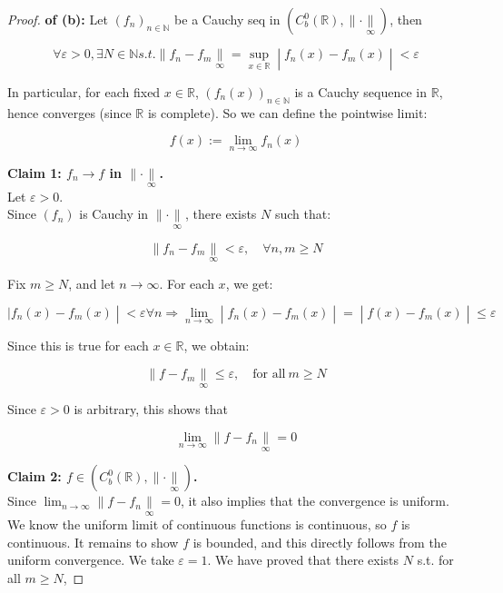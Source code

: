 \begin{proof}

\textbf{of (b):} Let \((f_{n})_{n \in \mathbb{N}}\) be a Cauchy seq in \((C_{b}^{0}(\mathbb{R}), \parallel \cdot \underset{\infty}{\parallel})\), then

\[\left. \forall\varepsilon > 0,\exists N \in \mathbb{N} s.t. \parallel f_{n} - f_{m}\underset{\infty}{\parallel} = \sup\limits_{x \in \mathbb{R}} \middle| f_{n}(x) - f_{m}(x) \middle| < \varepsilon \right.\]

In particular, for each fixed \(x \in \mathbb{R}\), \((f_{n}(x))_{n \in \mathbb{N}}\) is a Cauchy sequence in \(\mathbb{R}\), hence converges (since \(\mathbb{R}\) is complete). So we can define the pointwise limit:

\[f(x) := \lim\limits_{n\rightarrow\infty}f_{n}(x)\]

\textbf{Claim 1: \(f_{n}\rightarrow f\) in \(\parallel \cdot \underset{\infty}{\parallel}\).}\\
Let \(\varepsilon > 0\).\\
Since \((f_{n})\) is Cauchy in \(\parallel \cdot \underset{\infty}{\parallel}\), there exists \(N\) such that:

\[\parallel f_{n} - f_{m}\underset{\infty}{\parallel} < \varepsilon,\quad\forall n,m \geq N\]

Fix \(m \geq N\), and let \(n\rightarrow\infty\). For each \(x\), we get:

\[\left. |f_{n}(x) - f_{m}(x) \middle| < \varepsilon\forall n\Longrightarrow\lim\limits_{n\rightarrow\infty} \middle| f_{n}(x) - f_{m}(x) \middle| = \middle| f(x) - f_{m}(x) \middle| \leq \varepsilon \right.\]

Since this is true for each \(x \in \mathbb{R}\), we obtain:

\[\parallel f - f_{m}\underset{\infty}{\parallel} \leq \varepsilon,\quad\text{for all}\ m \geq N\]

Since \(\varepsilon > 0\) is arbitrary, this shows that

\[\lim\limits_{n\rightarrow\infty} \parallel f - f_{n}\underset{\infty}{\parallel} = 0\]

\textbf{Claim 2: \(f \in (C_{b}^{0}(\mathbb{R}), \parallel \cdot \underset{\infty}{\parallel})\).}\\
Since \(\lim_{n\rightarrow\infty} \parallel f - f_{n}\underset{\infty}{\parallel} = 0\), it also implies that the convergence is uniform.\\
We know the uniform limit of continuous functions is continuous, so \(f\) is continuous. It remains to show \(f\) is bounded, and this directly follows from the uniform convergence. We take \(\varepsilon = 1\). We have proved that there exists \(N\) s.t. for all \(m \geq N\),


\end{proof}
